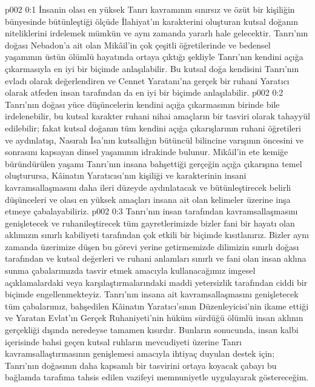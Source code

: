 \vs p002 0:1 İnsanin olası en yüksek Tanrı kavramının sınırsız ve özüt bir kişiliğin bünyesinde bütünleştiği ölçüde İlahiyat’ın karakterini oluşturan kutsal doğanın niteliklerini irdelemek mümkün ve aynı zamanda yararlı hale gelecektir. Tanrı’nın doğası Nebadon'a ait olan Mikâil’in çok çeşitli öğretilerinde ve bedensel yaşamının üstün ölümlü hayatında ortaya çıktığı şekliyle Tanrı’nın kendini açığa çıkarmasıyla en iyi bir biçimde anlaşılabilir. Bu kutsal doğa kendisini Tanrı’nın evladı olarak değerlendiren ve Cennet Yaratanı’na gerçek bir ruhani Yaratıcı olarak atfeden insan tarafından da en iyi bir biçimde anlaşılabilir.
\vs p002 0:2 Tanrı’nın doğası yüce düşüncelerin kendini açığa çıkarmasının birinde bile irdelenebilir, bu kutsal karakter ruhani nihai amaçların bir tasviri olarak tahayyül edilebilir; fakat kutsal doğanın tüm kendini açığa çıkarışlarının ruhani öğretileri ve aydınlatışı, Nasıralı İsa’nın kutsallığın bütüncül bilincine varışının öncesini ve sonrasını kapsayan dinsel yaşamının idrakinde bulunur. Mikâil’in ete kemiğe büründürülen yaşamı Tanrı’nın insana bahşettiği gerçeğin açığa çıkarışına temel oluşturursa, Kâinatın Yaratıcısı’nın kişiliği ve karakterinin insani kavramsallaşmasını daha ileri düzeyde aydınlatacak ve bütünleştirecek belirli düşünceleri ve olası en yüksek amaçları insana ait olan kelimeler üzerine inşa etmeye çabalayabiliriz.
\vs p002 0:3 Tanrı’nın insan tarafından kavramsallaşmasını genişletecek ve ruhanileştirecek tüm gayretlerimizde bizler fani bir hayatı olan aklımızın sınırlı kabiliyeti tarafından çok etkili bir biçimde kısıtlanırız. Bizler aynı zamanda üzerimize düşen bu görevi yerine getirmemizde dilimizin sınırlı doğası tarafından ve kutsal değerleri ve ruhani anlamları sınırlı ve fani olan insan aklına sunma çabalarımızda tasvir etmek amacıyla kullanacağımız imgesel açıklamalardaki veya karşılaştırmalarındaki maddi yetersizlik tarafından ciddi bir biçimde engellenmekteyiz. Tanrı’nın insana ait kavramsallaşmasını genişletecek tüm çabalarımız, bahşedilen Kâinatın Yaratıcı’sının Düzenleyicisi’nin ikame ettiği ve Yaratan Evlat’ın Gerçek Ruhaniyeti’nin hüküm sürdüğü ölümlü insan aklının gerçekliği dışında neredeyse tamamen kısırdır. Bunların sonucunda, insan kalbi içerisinde bahsi geçen kutsal ruhların mevcudiyeti üzerine Tanrı kavramsallaştırmasının genişlemesi amacıyla ihtiyaç duyulan destek için; Tanrı’nın doğasının daha kapsamlı bir tasvirini ortaya koyacak çabayı bu bağlamda tarafıma tahsis edilen vazifeyi memnuniyetle uygulayarak göstereceğim.
